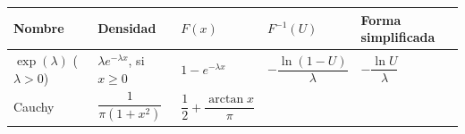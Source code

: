 \documentclass[]{book}
\theoremstyle{definition}
\theoremstyle{definition}
\theoremstyle{definition}
\theoremstyle{remark}
\begin{document}
\begin{longtable}[]{@{}lllll@{}}
\toprule
\begin{minipage}[b]{0.17\columnwidth}\raggedright\strut
Nombre\strut
\end{minipage} & \begin{minipage}[b]{0.17\columnwidth}\raggedright\strut
Densidad\strut
\end{minipage} & \begin{minipage}[b]{0.17\columnwidth}\raggedright\strut
\(F\left( x\right)\)\strut
\end{minipage} & \begin{minipage}[b]{0.17\columnwidth}\raggedright\strut
\(F^{-1}\left( U\right)\)\strut
\end{minipage} & \begin{minipage}[b]{0.17\columnwidth}\raggedright\strut
Forma simplificada\strut
\end{minipage}\tabularnewline
\midrule
\endhead
\begin{minipage}[t]{0.17\columnwidth}\raggedright\strut
\(\exp\left( \lambda\right)\) (\(\lambda>0\))\strut
\end{minipage} & \begin{minipage}[t]{0.17\columnwidth}\raggedright\strut
\(\lambda e^{-\lambda x}\), si \(x\geq0\)\strut
\end{minipage} & \begin{minipage}[t]{0.17\columnwidth}\raggedright\strut
\(1-e^{-\lambda x}\)\strut
\end{minipage} & \begin{minipage}[t]{0.17\columnwidth}\raggedright\strut
\(-\dfrac{\ln\left( 1-U\right) }\lambda\)\strut
\end{minipage} & \begin{minipage}[t]{0.17\columnwidth}\raggedright\strut
\(-\dfrac{\ln U}\lambda\)\strut
\end{minipage}\tabularnewline
\begin{minipage}[t]{0.17\columnwidth}\raggedright\strut
Cauchy\strut
\end{minipage} & \begin{minipage}[t]{0.17\columnwidth}\raggedright\strut
\(\dfrac1{\pi\left( 1+x^{2}\right) }\)\strut
\end{minipage} & \begin{minipage}[t]{0.17\columnwidth}\raggedright\strut
\(\dfrac12+\dfrac{\arctan x}\pi\)\strut
\end{minipage} & \begin{minipage}[t]{0.17\columnwidth}\raggedright\strut

\end{minipage}
\end{longtable}
\end{document}
